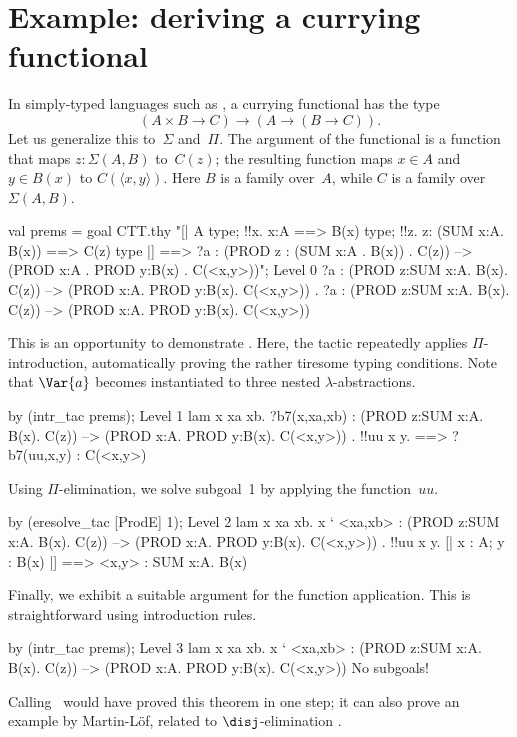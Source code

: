 \section{Example: deriving a currying functional}
In simply-typed languages such as {\ML}, a currying functional has the type 
\[ (A\times B \to C) \to (A\to (B\to C)). \]
Let us generalize this to~$\Sigma$ and~$\Pi$.  The argument of the
functional is a function that maps $z:\Sigma(A,B)$ to~$C(z)$; the resulting
function maps $x\in A$ and $y\in B(x)$ to $C(\langle x,y\rangle)$.  Here
$B$ is a family over~$A$, while $C$ is a family over $\Sigma(A,B)$.
\begin{ttbox}
val prems = goal CTT.thy
    "[| A type; !!x. x:A ==> B(x) type;                    \ttback
\ttback               !!z. z: (SUM x:A. B(x)) ==> C(z) type |]   \ttback
\ttback    ==> ?a : (PROD z : (SUM x:A . B(x)) . C(z))           \ttback
\ttback         --> (PROD x:A . PROD y:B(x) . C(<x,y>))";
{\out Level 0}
{\out ?a : (PROD z:SUM x:A. B(x). C(z)) --> (PROD x:A. PROD y:B(x). C(<x,y>))}
{. ?a : (PROD z:SUM x:A. B(x). C(z)) -->}
{\out          (PROD x:A. PROD y:B(x). C(<x,y>))}
\end{ttbox}
This is an opportunity to demonstrate .  Here, the tactic
repeatedly applies $\Pi$-introduction, automatically proving the rather
tiresome typing conditions.  Note that $\Var{a}$ becomes instantiated to
three nested $\lambda$-abstractions.
\begin{ttbox}
by (intr_tac prems);
{\out Level 1}
{\out lam x xa xb. ?b7(x,xa,xb)}
{\out : (PROD z:SUM x:A. B(x). C(z)) --> (PROD x:A. PROD y:B(x). C(<x,y>))}
{. !!uu x y.}
{ ==>}
{\out        ?b7(uu,x,y) : C(<x,y>)}
\end{ttbox}
Using $\Pi$-elimination, we solve subgoal~1 by applying the function~$uu$.
\begin{ttbox}
by (eresolve_tac [ProdE] 1);
{\out Level 2}
{\out lam x xa xb. x ` <xa,xb>}
{\out : (PROD z:SUM x:A. B(x). C(z)) --> (PROD x:A. PROD y:B(x). C(<x,y>))}
{. !!uu x y. [| x : A; y : B(x) |] ==> <x,y> : SUM x:A. B(x)}
\end{ttbox}
Finally, we exhibit a suitable argument for the function application.  This
is straightforward using introduction rules.
\begin{ttbox}
by (intr_tac prems);
{\out Level 3}
{\out lam x xa xb. x ` <xa,xb>}
{\out : (PROD z:SUM x:A. B(x). C(z)) --> (PROD x:A. PROD y:B(x). C(<x,y>))}
{\out No subgoals!}
\end{ttbox}
Calling~ would have proved this theorem in one step; it can
also prove an example by Martin-L\"of, related to $\disj$-elimination
\cite[page~58]{martinlof84}.


